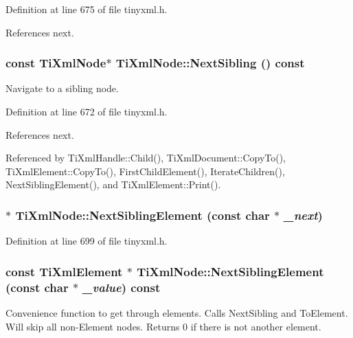 Definition at line 675 of file tinyxml.h.

References next.\hypertarget{class_ti_xml_node_af854baeba384f5fe9859f5aee03b548e}{
\subsubsection[{NextSibling}]{\setlength{\rightskip}{0pt plus 5cm}const {\bf TiXmlNode}$\ast$ TiXmlNode::NextSibling () const}}
\label{class_ti_xml_node_af854baeba384f5fe9859f5aee03b548e}


Navigate to a sibling node. 

Definition at line 672 of file tinyxml.h.

References next.

Referenced by TiXmlHandle::Child(), TiXmlDocument::CopyTo(), TiXmlElement::CopyTo(), FirstChildElement(), IterateChildren(), NextSiblingElement(), and TiXmlElement::Print().\hypertarget{class_ti_xml_node_a6e1ac6b800e18049bc75e9f8e63a8e5f}{
\subsubsection[{NextSiblingElement}]{$\ast$ TiXmlNode::NextSiblingElement (const char $\ast$ {\em \_\-next})}}
\label{class_ti_xml_node_a6e1ac6b800e18049bc75e9f8e63a8e5f}


Definition at line 699 of file tinyxml.h.\hypertarget{class_ti_xml_node_a3d7897999f99cf4870dd59df6331d7ff}{
\subsubsection[{NextSiblingElement}]{\setlength{\rightskip}{0pt plus 5cm}const {\bf TiXmlElement} $\ast$ TiXmlNode::NextSiblingElement (const char $\ast$ {\em \_\-value}) const}}
\label{class_ti_xml_node_a3d7897999f99cf4870dd59df6331d7ff}
Convenience function to get through elements. Calls NextSibling and ToElement. Will skip all non-\/Element nodes. Returns 0 if there is not another element. 

